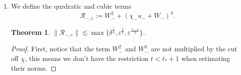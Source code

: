\documentclass[letterpaper,11pt]{article}
\newcommand{\rmO}{\mathcal{O}}
\newcommand{\eps}{\varepsilon}
\newcommand{\lar}{ \lesssim }
\numberwithin{equation}{section}
\theoremstyle{plain}
\newtheorem{theorem}{Theorem}[section]
\begin{document}
\begin{itemize}
\begin{enumerate}
\begin{proof}
For $0<t<\eps^{-1}\delta$, where the weight $I(t) $ equals $[\delta^{-\frac{1}{4}} (\delta -\eps t)^{\frac{3}{2}}+\delta^{\frac{1}{4}}\eps^{\frac{2}{3}}]^{-1}$, it is convenient to write the term $T_\infty -t$ as follows:
\[
T_\infty -t = \eps^{-1}\delta + \eps^{-\frac{1}{3}}\Omega_0 - t  = \eps^{-1}\left[(\delta -\eps t) +\eps^{\frac{2}{3}}\Omega_0\right].
\]

It then follows that
\begin{align*}
|I(t)\chi_- u_+ W_+|_\infty &\lar I(t)(T_\infty - t)^{-(1+\eta)} \lar I(\eps^{-1}\delta)(T_\infty - \eps^{-1}\delta)^{-(1+\eta)} \\
&\lar \eps^{-\frac{2}{3}} \eps^{\frac{1+\eta}{3}} = \rmO(\eps^{\frac{\eta-1}{3}} ).
\end{align*}
Then we apply lemma \ref{u_-est} to $I(t)\chi_-u_-W_+$
\begin{align*}
|I(t)\chi_- u_- W_+|_\infty  &\lar \frac{\sqrt{\delta-\eps t}+\eps^{1/3}}{ \delta^{-\frac{1}{4}}(\delta-\eps t)^{\frac{3}{2}} + \delta^{\frac{1}{4}}\eps^{2/3}} (T_\infty - \eps^{-1}\delta)^{-\eta} \\
& = \frac{\sqrt{\delta-\eps t}+\eps^{1/3}}{ \delta^{-\frac{1}{4}}(\delta-\eps t)^{\frac{3}{2}} + \delta^{\frac{1}{4}}\eps^{2/3}} \frac{\eps^{\eta}}{(\delta -\eps t +\eps^{\frac{2}{3}}\Omega_0)^\eta}\\
&= \dfrac{(\delta \beta)^{1/2} + \eps^{1/3}} {(\delta \beta)^{3/2} + \eps^{2/3}} \dfrac{\eps^\eta}{(\delta \beta + \eps^{2/3} \Omega_0 )^{\eta} }\\
& \lar \dfrac{1} {(\delta \beta)^{3/2} + \eps^{2/3}} \dfrac{\eps^\eta}{( (\delta \beta)^{1/2} + \eps^{1/3} )^{2\eta -1} } \\
& \lar \eps^{\eta}\eps^{-\frac{2}{3}}\eps^{\frac{1-2\eta}{3}} = \eps^{\frac{\eta-1}{3}},
\end{align*}
where $\beta = 1-\eps \delta^{-1}t$.
\end{proof}




\item  We define the qurdratic and cubic terms
\[
\mathcal{R}_{-,c}:= W_-^2 +(\chi_- u_- +W_-)^3.
\]

\begin{theorem} \label{R_-,c est}
$\|\mathcal{R}_{-,c}\| \lar \max\{ \delta^{\frac{1}{4}},\eps^{\frac{\nu}{6}}, \eps^{\frac{1-\nu}{3}}\}$.
\end{theorem}

\begin{proof}
First, notice that the term $W_-^2$ and $W_-^3$ are not multiplied by the cut off $\chi$, this means we don't have the restriction $t<t_*+1$ when estimating their norms.


\end{proof}
\end{enumerate}
\end{itemize}
\end{document}

